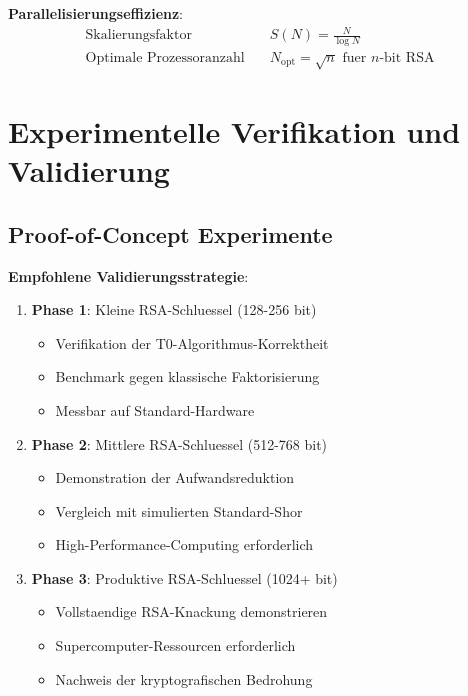 \documentclass[12pt,a4paper]{article}
\begin{document}
	\textbf{Parallelisierungseffizienz}:
	\begin{align}
		\text{Skalierungsfaktor} \quad &S(N) = \frac{N}{\log N} \\
		\text{Optimale Prozessoranzahl} \quad &N_{\text{opt}} = \sqrt{n} \text{ fuer } n\text{-bit RSA}
	\end{align}
	
	\section{Experimentelle Verifikation und Validierung}
	
	\subsection{Proof-of-Concept Experimente}
	
	\textbf{Empfohlene Validierungsstrategie}:
	
	\begin{enumerate}
		\item \textbf{Phase 1}: Kleine RSA-Schluessel (128-256 bit)
		\begin{itemize}
			\item Verifikation der T0-Algorithmus-Korrektheit
			\item Benchmark gegen klassische Faktorisierung
			\item Messbar auf Standard-Hardware
		\end{itemize}
		
		\item \textbf{Phase 2}: Mittlere RSA-Schluessel (512-768 bit)
		\begin{itemize}
			\item Demonstration der Aufwandsreduktion
			\item Vergleich mit simulierten Standard-Shor
			\item High-Performance-Computing erforderlich
		\end{itemize}
		
		\item \textbf{Phase 3}: Produktive RSA-Schluessel (1024+ bit)
		\begin{itemize}
			\item Vollstaendige RSA-Knackung demonstrieren
			\item Supercomputer-Ressourcen erforderlich
			\item Nachweis der kryptografischen Bedrohung
		\end{itemize}
	\end{enumerate}
	
\end{document}
